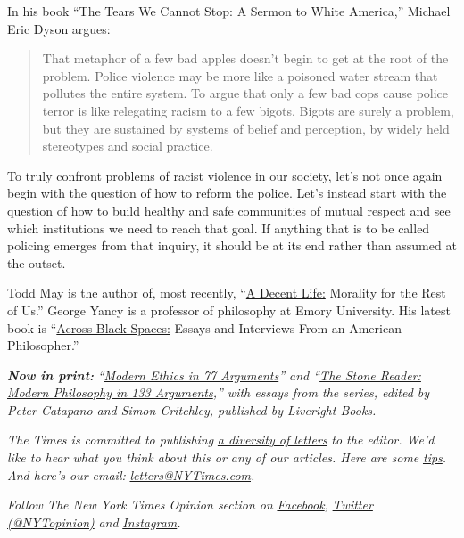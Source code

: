 In his book ``The Tears We Cannot Stop: A Sermon to White America,''
Michael Eric Dyson argues:

\begin{quote}
That metaphor of a few bad apples doesn't begin to get at the root of
the problem. Police violence may be more like a poisoned water stream
that pollutes the entire system. To argue that only a few bad cops cause
police terror is like relegating racism to a few bigots. Bigots are
surely a problem, but they are sustained by systems of belief and
perception, by widely held stereotypes and social practice.
\end{quote}

To truly confront problems of racist violence in our society, let's not
once again begin with the question of how to reform the police. Let's
instead start with the question of how to build healthy and safe
communities of mutual respect and see which institutions we need to
reach that goal. If anything that is to be called policing emerges from
that inquiry, it should be at its end rather than assumed at the outset.

Todd May is the author of, most recently,
``\href{https://press.uchicago.edu/ucp/books/book/chicago/D/bo34250692.html}{A
Decent Life:} Morality for the Rest of Us.'' George Yancy is a professor
of philosophy at Emory University. His latest book is
``\href{https://rowman.com/ISBN/9781538131619/Across-Black-Spaces-Essays-and-Interviews-from-an-American-Philosopher}{Across
Black Spaces:} Essays and Interviews From an American Philosopher.''

\emph{\textbf{Now in print:}}
\emph{``}\href{http://bitly.com/1MW2kN3}{\emph{Modern Ethics in 77
Arguments}}\emph{'' and ``}\href{http://bitly.com/1MW2kN3}{\emph{The
Stone Reader: Modern Philosophy in 133 Arguments}}\emph{,'' with essays
from the series, edited by Peter Catapano and Simon Critchley, published
by Liveright Books.}

\emph{The Times is committed to publishing}
\href{https://www.nytimes3xbfgragh.onion/2019/01/31/opinion/letters/letters-to-editor-new-york-times-women.html}{\emph{a
diversity of letters}} \emph{to the editor. We'd like to hear what you
think about this or any of our articles. Here are some}
\href{https://help.nytimes3xbfgragh.onion/hc/en-us/articles/115014925288-How-to-submit-a-letter-to-the-editor}{\emph{tips}}\emph{.
And here's our email:}
\href{mailto:letters@NYTimes.com}{\emph{letters@NYTimes.com}}\emph{.}

\emph{Follow The New York Times Opinion section on}
\href{https://www.facebookcorewwwi.onion/nytopinion}{\emph{Facebook}}\emph{,}
\href{http://twitter.com/NYTOpinion}{\emph{Twitter (@NYTopinion)}}
\emph{and}
\href{https://www.instagram.com/nytopinion/}{\emph{Instagram}}\emph{.}


